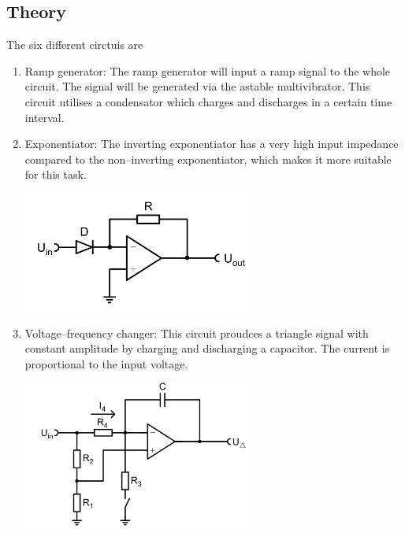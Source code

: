 \documentclass[a4paper,10pt]{article}
\newenvironment{Figure}
        {\par\medskip\noindent\minipage{\linewidth}}
        {\endminipage\par\medskip} %
\numberwithin{equation}{section}
\begin{document}
\begin{multicols}{2}
	\section{Theory}
	The six different circtuis are
	\begin{enumerate}[label=\arabic*]
		\item Ramp generator:
		      The ramp generator will input a ramp signal to the whole circuit.
		      The signal will be generated via the astable multivibrator.
		      This circuit utilises a condensator which charges and discharges in a certain time interval.
		\item Exponentiator:
		      The inverting exponentiator has a very high input impedance compared to the non--inverting exponentiator, which makes it more suitable for this task.
		      \begin{Figure}
			      \centering
			      \includegraphics[width=0.6\textwidth]{inverting_exp.png}
			      \label{fig:invexpo}
		      \end{Figure}
		\item Voltage--frequency changer:
		      This circuit proudces a triangle signal with constant amplitude by charging and discharging a capacitor.
		      The current is proportional to the input voltage.
		      \begin{Figure}
			      \centering
			      \includegraphics[width=0.6\textwidth]{reversible_integrator.png}
		      \end{Figure}

\end{enumerate}
\end{multicols}
\end{document}
